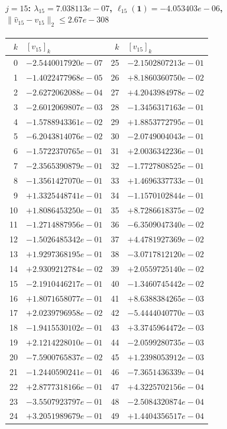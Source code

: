 \paragraph{$j = 15$: $\lambda_{15} = 7.038113e-07$, \quad $\ell_{15}(\mathbf{1}) = -4.053403e-06$, \quad $\|\hat{v}_{15} - v_{15}\|_2 \leq 2.67e-308$}
\begin{center}
{\footnotesize
\begin{tabular}{r@{\;\;}l@{\quad}r@{\;\;}l}
\toprule
$k$ & $[v_{15}]_k$ & $k$ & $[v_{15}]_k$ \\
\midrule
0 & $-2.5440017920e-07$ & 25 & $-2.1502807213e-01$ \\
1 & $-1.4022477968e-05$ & 26 & $+8.1860360750e-02$ \\
2 & $-2.6272062088e-04$ & 27 & $+4.2043984978e-02$ \\
3 & $-2.6012069807e-03$ & 28 & $-1.3456317163e-01$ \\
4 & $-1.5788943361e-02$ & 29 & $+1.8853772795e-01$ \\
5 & $-6.2043814076e-02$ & 30 & $-2.0749004043e-01$ \\
6 & $-1.5722370765e-01$ & 31 & $+2.0036342236e-01$ \\
7 & $-2.3565390879e-01$ & 32 & $-1.7727808525e-01$ \\
8 & $-1.3561427070e-01$ & 33 & $+1.4696337733e-01$ \\
9 & $+1.3325448741e-01$ & 34 & $-1.1570102844e-01$ \\
10 & $+1.8086453250e-01$ & 35 & $+8.7286618375e-02$ \\
11 & $-1.2714887956e-01$ & 36 & $-6.3509047340e-02$ \\
12 & $-1.5026485342e-01$ & 37 & $+4.4781927369e-02$ \\
13 & $+1.9297368195e-01$ & 38 & $-3.0717812120e-02$ \\
14 & $+2.9309212784e-02$ & 39 & $+2.0559725140e-02$ \\
15 & $-2.1910446217e-01$ & 40 & $-1.3460745442e-02$ \\
16 & $+1.8071658077e-01$ & 41 & $+8.6388384265e-03$ \\
17 & $+2.0239796958e-02$ & 42 & $-5.4444040770e-03$ \\
18 & $-1.9415530102e-01$ & 43 & $+3.3745964472e-03$ \\
19 & $+2.1214228010e-01$ & 44 & $-2.0599280735e-03$ \\
20 & $-7.5900765837e-02$ & 45 & $+1.2398053912e-03$ \\
21 & $-1.2440590241e-01$ & 46 & $-7.3651436339e-04$ \\
22 & $+2.8777318166e-01$ & 47 & $+4.3225702156e-04$ \\
23 & $-3.5507923797e-01$ & 48 & $-2.5084320874e-04$ \\
24 & $+3.2051989679e-01$ & 49 & $+1.4404356517e-04$ \\
\bottomrule
\end{tabular}
}
\end{center}

